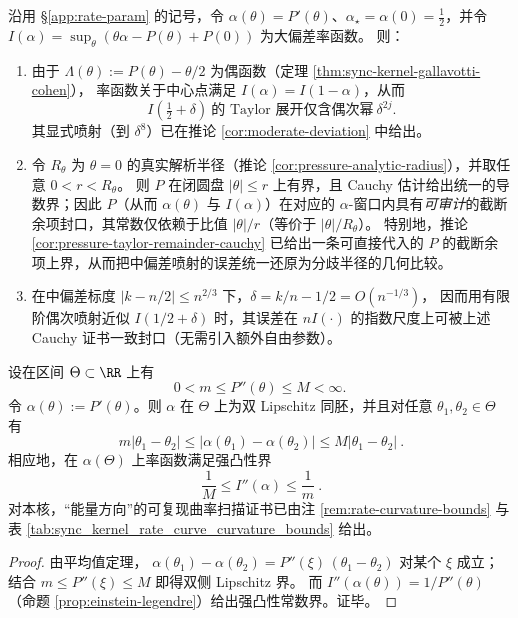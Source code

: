 \begin{proposition}\label{prop:sync-kernel-moderate-deviation-cauchy-certified}
沿用 \S\ref{app:rate-param} 的记号，令 \(\alpha(\theta)=P'(\theta)\)、\(\alpha_\star=\alpha(0)=\tfrac12\)，并令
\(
I(\alpha)=\sup_{\theta}(\theta\alpha-P(\theta)+P(0))
\)
为大偏差率函数。
则：
\begin{enumerate}
  \item 由于 \(\Lambda(\theta):=P(\theta)-\theta/2\) 为偶函数（定理 \ref{thm:sync-kernel-gallavotti-cohen}），
  率函数关于中心点满足 \(I(\alpha)=I(1-\alpha)\)，从而
  \[
  I\!\left(\tfrac12+\delta\right)\ \text{的 Taylor 展开仅含偶次幂}\ \delta^{2j}.
  \]
  其显式喷射（到 \(\delta^8\)）已在推论 \ref{cor:moderate-deviation} 中给出。
  \item 令 \(R_\theta\) 为 \(\theta=0\) 的真实解析半径（推论 \ref{cor:pressure-analytic-radius}），并取任意 \(0<r<R_\theta\)。
  则 \(P\) 在闭圆盘 \(|\theta|\le r\) 上有界，且 Cauchy 估计给出统一的导数界；因此 \(P\)（从而 \(\alpha(\theta)\) 与 \(I(\alpha)\)）在对应的 \(\alpha\)-窗口内具有\emph{可审计}的截断余项封口，其常数仅依赖于比值 \(|\theta|/r\)（等价于 \(|\theta|/R_\theta\)）。
  特别地，推论 \ref{cor:pressure-taylor-remainder-cauchy} 已给出一条可直接代入的 \(P\) 的截断余项上界，从而把中偏差喷射的误差统一还原为分歧半径的几何比较。
  \item 在中偏差标度 \(|k-n/2|\le n^{2/3}\) 下，\(\delta=k/n-1/2=O(n^{-1/3})\)，
  因而用有限阶偶次喷射近似 \(I(1/2+\delta)\) 时，其误差在 \(nI(\cdot)\) 的指数尺度上可被上述 Cauchy 证书一致封口（无需引入额外自由参数）。
\end{enumerate}
\end{proposition}

\begin{proposition}[曲率双侧界 \texorpdfstring{$\Rightarrow$}{=>} \texorpdfstring{$(\theta\leftrightarrow\alpha)$}{theta<->alpha} 的双 Lipschitz 与率函数的强凸性常数]\label{prop:sync-kernel-curvature-bilipschitz}
设在区间 \(\Theta\subset\RR\) 上有
\[
0<m\le P''(\theta)\le M<\infty.
\]
令 \(\alpha(\theta):=P'(\theta)\)。则 \(\alpha\) 在 \(\Theta\) 上为双 Lipschitz 同胚，并且对任意 \(\theta_1,\theta_2\in\Theta\) 有
\[
\boxed{\ m|\theta_1-\theta_2|\le |\alpha(\theta_1)-\alpha(\theta_2)|\le M|\theta_1-\theta_2|\ }.
\]
相应地，在 \(\alpha(\Theta)\) 上率函数满足强凸性界
\[
\boxed{\ \frac{1}{M}\le I''(\alpha)\le \frac{1}{m}\ }.
\]
对本核，“能量方向”的可复现曲率扫描证书已由注 \ref{rem:rate-curvature-bounds} 与表 \ref{tab:sync_kernel_rate_curve_curvature_bounds} 给出。
\end{proposition}

\begin{proof}
由平均值定理，
\(
\alpha(\theta_1)-\alpha(\theta_2)=P''(\xi)\,(\theta_1-\theta_2)
\)
对某个 \(\xi\) 成立；结合 \(m\le P''(\xi)\le M\) 即得双侧 Lipschitz 界。
而 \(I''(\alpha(\theta))=1/P''(\theta)\)（命题 \ref{prop:einstein-legendre}）给出强凸性常数界。证毕。
\end{proof}
